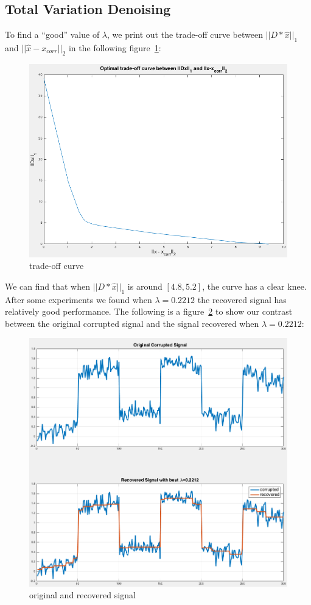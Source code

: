 \documentclass[10pt,a4paper]{article}
\begin{document}
\subsection{Total Variation Denoising}
To find a ``good'' value of $\lambda$, we print out the
trade-off curve between $||D*\hat{x}||_1$ and
$||\hat{x}-x_{corr}||_2$ in the following figure~\ref{fig:q3tradeoff}:

\begin{figure}[ht]
  \centering
  \includegraphics[width=0.7\linewidth]{Q3_tradeoff}
  \caption{trade-off curve}
  \label{fig:q3tradeoff}
\end{figure}

We can find that when $||D*\hat{x}||_1$ is around
$[4.8,5.2]$, the curve has a clear knee. After some
experiments we found when $\lambda = 0.2212$ the recovered
signal has relatively good performance. The following is a
figure~\ref{fig:q3recovered} to show our contrast between the original corrupted
signal and the signal recovered when $\lambda = 0.2212$:


\begin{figure}[ht]
  \centering
  \includegraphics[width=0.8\linewidth]{Q3_signal}
  \caption{original and recovered signal}
  \label{fig:q3recovered}
\end{figure}
\end{document}
